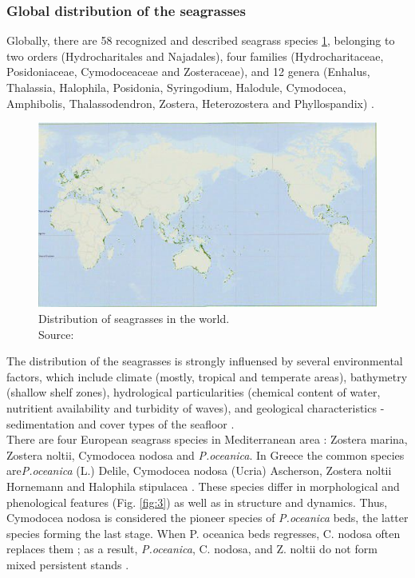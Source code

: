 \documentclass[10pt, a4paper]{article}
\begin{document}
\subsubsection{Global distribution of the seagrasses}
Globally, there are 58 recognized and described seagrass species \ref{fig:2}, belonging to two orders
(Hydrocharitales and Najadales), four families (Hydrocharitaceae, Posidoniaceae, Cymodoceaceae
and Zosteraceae), and 12 genera (Enhalus, Thalassia, Halophila, Posidonia, Syringodium, Halodule,
Cymodocea, Amphibolis, Thalassodendron, Zostera, Heterozostera and Phyllospandix) \cite{Kuo89}\label{Kuo89}.
\begin{figure}
\centering
	\includegraphics[scale=0.25]{Fig-1-2.jpg}
	\caption{Distribution of seagrasses in the world.\\ Source:\cite{Green03}\label{Green03} \label{fig:2}} 
\end{figure}
The distribution of the seagrasses is strongly influensed by several environmental factors, which
include climate (mostly, tropical and temperate areas), bathymetry (shallow shelf zones), hydrological
particularities (chemical content of water, nutritient availability and turbidity of waves), and geological 
characteristics - sedimentation and cover types of the seafloor \cite{McKenzie06}\label{McKenzie06}.\\
There are four European seagrass species in Mediterranean area \cite{Borum04}\label{Borum04}: Zostera marina,
Zostera noltii, Cymodocea nodosa and \textit{P.oceanica}. In Greece the common species are\textit{P.oceanica}
(L.) Delile, Cymodocea nodosa (Ucria) Ascherson, Zostera noltii Hornemann and Halophila
stipulacea \cite{Amoutzopoulou-Schina05}\label{Amoutzopoulou-Schina05}. 
These species differ in morphological and
phenological features (Fig. \ref{fig:3}) as well as in structure and dynamics. Thus, Cymodocea nodosa is
considered the pioneer species of \textit{P.oceanica} beds, the latter species forming the last stage. When P.
oceanica beds regresses, C. nodosa often replaces them \cite{DenHartog77}\label{DenHartog77}; as a result, \textit{P.oceanica},
C. nodosa, and Z. noltii do not form mixed persistent stands \cite{Buia91}\label{Buia91}.
\end{document}
